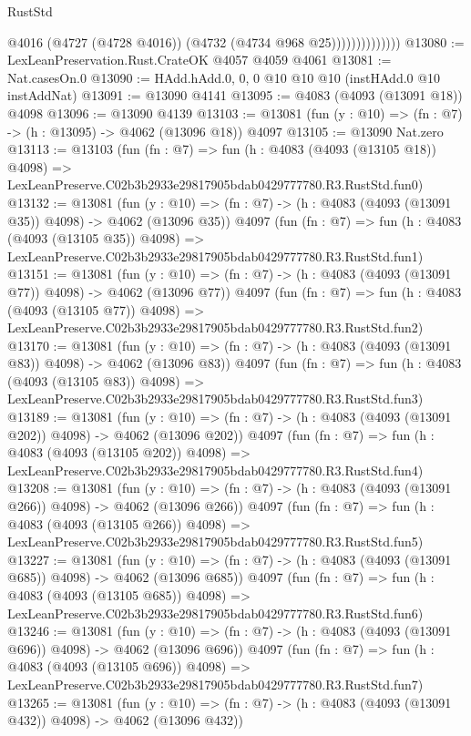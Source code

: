 \begin{lexlean}{RustStd}
\begin{coremodule}
                            @4016
                            (@4727 (@4728 @4016))
                            (@4732 (@4734 @968 @25))))))))))))))
@13080 := LexLeanPreservation.Rust.CrateOK @4057 @4059 @4061
@13081 := Nat.casesOn.{0}
@13090 := HAdd.hAdd.{0, 0, 0} @10 @10 @10 (instHAdd.{0} @10 instAddNat)
@13091 := @13090 @4141
@13095 := @4083 (@4093 (@13091 @18)) @4098
@13096 := @13090 @4139
@13103 := @13081 (fun (y : @10) => (fn : @7) -> (h : @13095) -> @4062 (@13096 @18)) @4097
@13105 := @13090 Nat.zero
@13113 := @13103
    (fun (fn : @7) =>
    fun (h : @4083 (@4093 (@13105 @18)) @4098) =>
    LexLeanPreserve.C02b3b2933e29817905bdab0429777780.R3.RustStd.fun0)
@13132 := @13081
    (fun (y : @10) => (fn : @7) -> (h : @4083 (@4093 (@13091 @35)) @4098) -> @4062 (@13096 @35))
    @4097
    (fun (fn : @7) =>
    fun (h : @4083 (@4093 (@13105 @35)) @4098) =>
    LexLeanPreserve.C02b3b2933e29817905bdab0429777780.R3.RustStd.fun1)
@13151 := @13081
    (fun (y : @10) => (fn : @7) -> (h : @4083 (@4093 (@13091 @77)) @4098) -> @4062 (@13096 @77))
    @4097
    (fun (fn : @7) =>
    fun (h : @4083 (@4093 (@13105 @77)) @4098) =>
    LexLeanPreserve.C02b3b2933e29817905bdab0429777780.R3.RustStd.fun2)
@13170 := @13081
    (fun (y : @10) => (fn : @7) -> (h : @4083 (@4093 (@13091 @83)) @4098) -> @4062 (@13096 @83))
    @4097
    (fun (fn : @7) =>
    fun (h : @4083 (@4093 (@13105 @83)) @4098) =>
    LexLeanPreserve.C02b3b2933e29817905bdab0429777780.R3.RustStd.fun3)
@13189 := @13081
    (fun (y : @10) => (fn : @7) -> (h : @4083 (@4093 (@13091 @202)) @4098) -> @4062 (@13096 @202))
    @4097
    (fun (fn : @7) =>
    fun (h : @4083 (@4093 (@13105 @202)) @4098) =>
    LexLeanPreserve.C02b3b2933e29817905bdab0429777780.R3.RustStd.fun4)
@13208 := @13081
    (fun (y : @10) => (fn : @7) -> (h : @4083 (@4093 (@13091 @266)) @4098) -> @4062 (@13096 @266))
    @4097
    (fun (fn : @7) =>
    fun (h : @4083 (@4093 (@13105 @266)) @4098) =>
    LexLeanPreserve.C02b3b2933e29817905bdab0429777780.R3.RustStd.fun5)
@13227 := @13081
    (fun (y : @10) => (fn : @7) -> (h : @4083 (@4093 (@13091 @685)) @4098) -> @4062 (@13096 @685))
    @4097
    (fun (fn : @7) =>
    fun (h : @4083 (@4093 (@13105 @685)) @4098) =>
    LexLeanPreserve.C02b3b2933e29817905bdab0429777780.R3.RustStd.fun6)
@13246 := @13081
    (fun (y : @10) => (fn : @7) -> (h : @4083 (@4093 (@13091 @696)) @4098) -> @4062 (@13096 @696))
    @4097
    (fun (fn : @7) =>
    fun (h : @4083 (@4093 (@13105 @696)) @4098) =>
    LexLeanPreserve.C02b3b2933e29817905bdab0429777780.R3.RustStd.fun7)
@13265 := @13081
    (fun (y : @10) => (fn : @7) -> (h : @4083 (@4093 (@13091 @432)) @4098) -> @4062 (@13096 @432))

\end{coremodule}
\end{lexlean}
